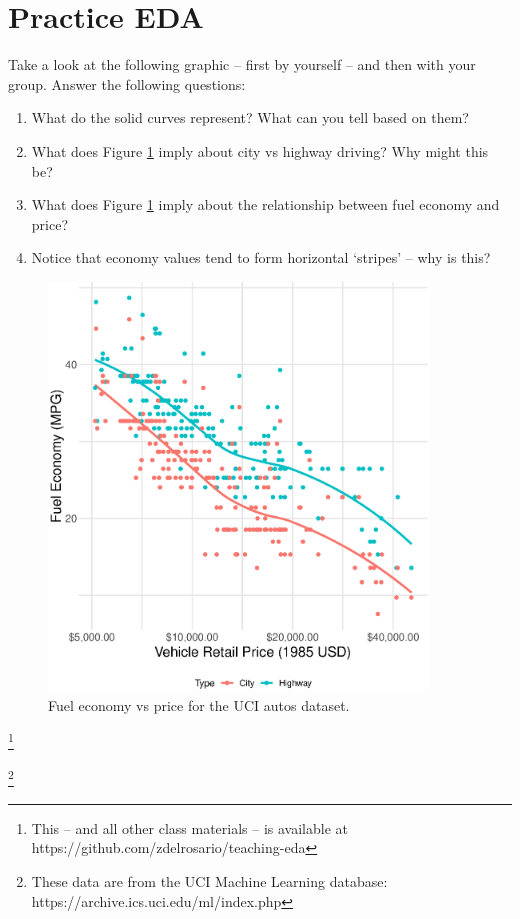 \documentclass{article}
\newcommand\blfootnote[1]{%
  \begingroup
  \renewcommand\thefootnote{}\footnote{#1}%
  \addtocounter{footnote}{-1}%
  \endgroup
}
\begin{document}
\section{Practice EDA}
Take a look at the following graphic -- first by yourself -- and then with your
group. Answer the following questions:

\begin{enumerate}
\item What do the solid curves represent? What can you tell based on them?
\item What does Figure \ref{fig:mpg-vs-usd} imply about city vs highway driving?
  Why might this be?
\item What does Figure \ref{fig:mpg-vs-usd} imply about the relationship between
  fuel economy and price?
\item Notice that economy values tend to form horizontal `stripes' -- why is
  this?
\end{enumerate}

\begin{figure}[!ht]
  \includegraphics[width=0.90\textwidth]{../images/mpg_vs_usd}
  \caption{Fuel economy vs price for the UCI autos dataset.}
  \label{fig:mpg-vs-usd}
\end{figure}

\blfootnote{This -- and all other class materials -- is available at
  https://github.com/zdelrosario/teaching-eda}

\blfootnote{These data are from the UCI Machine Learning database:
  https://archive.ics.uci.edu/ml/index.php}
\end{document}
